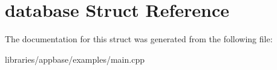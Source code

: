 \hypertarget{structdatabase}{}\section{database Struct Reference}
\label{structdatabase}


The documentation for this struct was generated from the following file\+:\begin{DoxyCompactItemize}
\item 
libraries/appbase/examples/main.\+cpp\end{DoxyCompactItemize}
